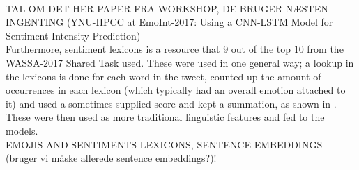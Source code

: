 \\
TAL OM DET HER PAPER FRA WORKSHOP, DE BRUGER NÆSTEN INGENTING (YNU-HPCC at EmoInt-2017: Using a CNN-LSTM Model for Sentiment Intensity Prediction)\\
Furthermore, sentiment lexicons is a resource that 9 out of the top 10 from the WASSA-2017 Shared Task used. These were used in one general way; a lookup in the lexicons is done for each word in the tweet, counted up the amount of occurrences in each lexicon (which typically had an overall emotion attached to it) and used a sometimes supplied score and kept a summation, as shown in \cite{seernet}. These were then used as more traditional linguistic features and fed to the models.\\
EMOJIS AND SENTIMENTS LEXICONS, SENTENCE EMBEDDINGS (bruger vi måske allerede sentence embeddings?)!